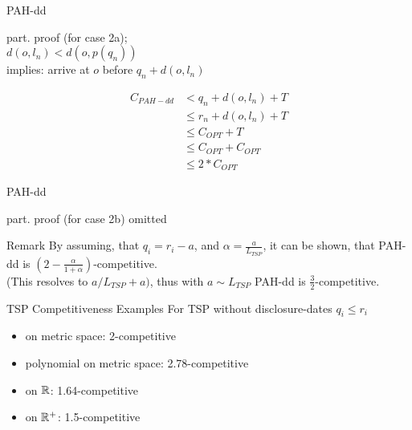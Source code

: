 \begin{frame}{PAH-dd}
  \begin{Proof}
    part. proof (for case 2a);\\
    $d(o,l_n)<d(o,p(q_n))$ \\
    implies: arrive at $o$ before $q_n + d(o,l_n)$
    \begin{small}
    \begin{align}
      C_{PAH-dd} &  < q_n + d(o,l_n) + T \\
		 &\le r_n + d(o,l_n) + T \\
		 &\le C_{OPT} + T \\
		 &\le C_{OPT} + C_{OPT} \\
		 &\le 2* C_{OPT}
    \end{align}
    \end{small}
  \end{Proof}
\end{frame}

\begin{frame}{PAH-dd}
  \begin{Proof}
    part. proof (for case 2b) omitted
  \end{Proof}

  \begin{block}{Remark}
    By assuming, that $q_i = r_i - a$, and $\alpha = \frac{a}{L_{TSP}}$, it can be shown, that PAH-dd is $(2-\frac{\alpha}{1+\alpha})$-competitive.\\
    (This resolves to $a/L_{TSP}+a)$, thus with $a \sim L_{TSP}$ PAH-dd is $\frac{3}{2}$-competitive.
  \end{block}
\end{frame}

\begin{frame}{TSP Competitiveness Examples}
  For TSP without disclosure-dates $q_i \le r_i$
  \begin{itemize}
    \item on metric space: 2-competitive
    \item polynomial on metric space: 2.78-competitive
    \item on $\Bbb{R}$: 1.64-competitive
    \item on $\Bbb{R}^+$: 1.5-competitive
  \end{itemize}
\end{frame} 

